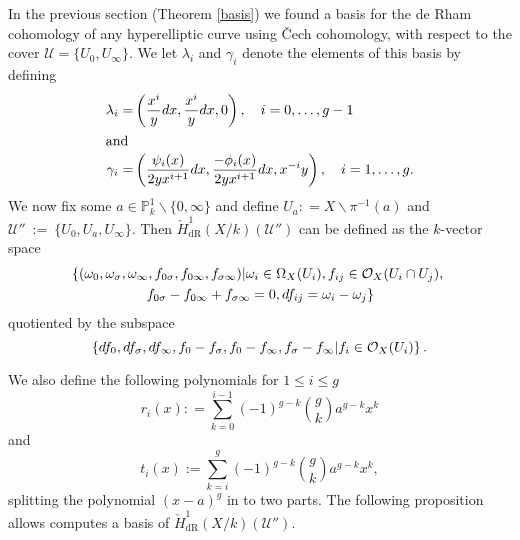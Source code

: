 \documentclass[draft, 11pt]{article} %
\theoremstyle{plain}
\theoremstyle{remark}
\newcommand{\cO}{{\cal O}}
\newcommand{\cU}{{\mathcal U}}
\newcommand{\cech}{\v{C}ech }
\newcommand{\cechderhamhone}{\check{H}_{\text {dR}}^1(X/k)}
\begin{document}
In the previous section (Theorem \ref{basis}) we found a basis for the de Rham cohomology of any hyperelliptic curve using \cech cohomology, with respect to the cover $\cU = \{ U_0 , U_\infty\}$.
We let $\lambda_i$ and $\gamma_i$ denote the elements of this basis by defining
\begin{align*}
\lambda_i  = & \left( \frac{x^i}{y}dx, \frac{x^i}{y}dx, 0\right) ,\quad i=0, \ldots, g-1 \\
\intertext{and}
\gamma_i = & \left ( \frac{\psi_i(x)}{2yx^{i+1}}dx, \frac{-\phi_i(x)}{2yx^{i+1}}dx, x^{-i}y \right), \quad i=1,\ldots ,g.
\end{align*}
We now fix some $a \in \mathbb P_k^1\backslash \{0, \infty\}$ and define $U_a : = X \backslash \pi^{-1}(a)$ and $\cU''~:=~\{U_0,U_a, U_\infty\}$.
Then $\cechderhamhone(\cU'')$ can be defined as the $k$-vector space 
\begin{multline}\label{sixtupleconditions}
\left\{ (\omega_0, \omega_\sigma, \omega_\infty , f_{0\sigma}, f_{0 \infty},f_{\sigma \infty}) | \omega_i \in \Omega_X(U_i), f_{ij} \in \cO_X(U_i \cap U_j), \right. \\ \left. f_{0\sigma} - f_{0\infty} + f_{\sigma \infty} = 0, df_{ij} = \omega_i - \omega_j \right\}
\end{multline}
quotiented by the subspace 
\[
\left\{ df_0, df_\sigma, df_\infty, f_0- f_\sigma, f_0 - f_\infty, f_\sigma - f_\infty | f_i \in \cO_X(U_i)\right\}.
\]

We also define the following polynomials for $1 \leq i \leq g$
\[
r_i(x) : = \sum_{k=0}^{i-1} (-1)^{g-k}\binom{g}{k} a^{g-k} x^k
\]
and
\[
t_i(x) := \sum_{k=i}^{g} (-1)^{g-k}\binom{g}{k} a^{g-k} x^k,
\]
splitting the polynomial $(x-a)^g$ in to two parts.
The following proposition allows computes a basis of $\cechderhamhone(\cU'')$.
\end{document}

